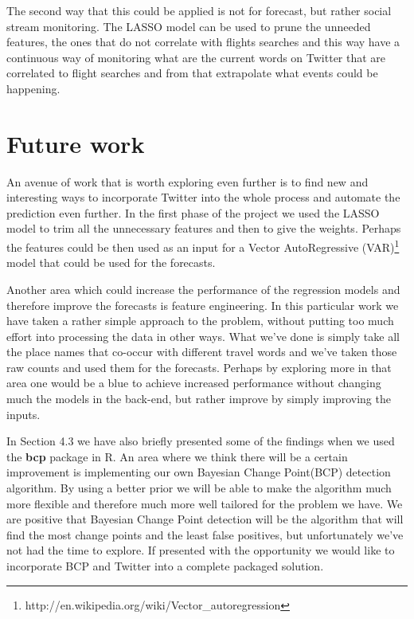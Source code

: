 \documentclass[minf,twoside,singlespacing,parskip,notimes,deptreport]{infthesis} %
\begin{document}
The second way that this could be applied is not for forecast, but rather social stream monitoring. The LASSO model can be used to prune the unneeded features, the ones that do not correlate with flights searches and this way have a continuous way of monitoring what are the current words on Twitter that are correlated to flight searches and from that extrapolate what events could be happening.

\section{Future work}


An avenue of work that is worth exploring even further is to find new and interesting ways to incorporate Twitter into the whole process and automate the prediction even further. In the first phase of the project we used the LASSO model to trim all the unnecessary features and then to give the weights. Perhaps the features could be then used as an input for a Vector AutoRegressive (VAR)\footnote{http://en.wikipedia.org/wiki/Vector\_autoregression} model that could be used for the forecasts. 

Another area which could increase the performance of the regression models and therefore improve the forecasts is feature engineering. In this particular work we have taken a rather simple approach to the problem, without putting too much effort into processing the data in other ways. What we've done is simply take all the place names that co-occur with different travel words and we've taken those raw counts and used them for the forecasts. Perhaps by exploring more in that area one would be a blue to achieve increased performance without changing much the models in the back-end, but rather improve by simply improving the inputs.

In Section 4.3 we have also briefly presented some of the findings when we used the \textbf{bcp} package in R. An area where we think there will be a certain improvement is implementing our own Bayesian Change Point(BCP) detection algorithm. By using a better prior we will be able to make the algorithm much more flexible and therefore much more well tailored for the problem we have. We are positive that Bayesian Change Point detection will be the algorithm that will find the most change points and the least false positives, but unfortunately we've not had the time to explore. If presented with the opportunity we would like to incorporate BCP and Twitter into a complete packaged solution.
\end{document}
